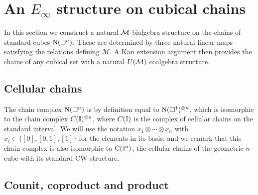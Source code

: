 
\section{An $E_\infty$ structure on cubical chains} \label{s:action}

In this section we construct a natural $\mathcal{M}$-bialgebra structure on the chains of standard cubes $\operatorname{N}(\square^n)$.
These are determined by three natural linear maps satisfying the relations defining $\mathcal M$.
A Kan extension argument then provides the chains of any cubical set with a natural $U(\mathcal{M})$ coalgebra structure.

\subsection{Cellular chains}

The chain complex $\operatorname{N}(\square^n)$ is by definition equal to $\operatorname{N}(\square^1)^{\otimes n}$, which is isomorphic to the chain complex $C(\mathbb{I})^{\otimes n}$, where $C(\mathbb{I})$ is the complex of cellular chains on the standard interval.
We will use the notation $x_1 \otimes \cdots \otimes x_n$ with $x_i \in \{[0], [0,1], [1]\}$ for the elements in its basis, and we remark that this chain complex is also isomorphic to $\operatorname{C}(\mathbb{I}^n)$, the cellular chains of the geometric $n$-cube with its standard CW structure.

\subsection{Counit, coproduct and product}

